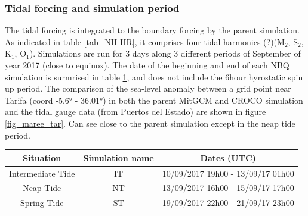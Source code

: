 \subsubsection{Tidal forcing and simulation period}
The tidal forcing is integrated to the boundary forcing by the parent simulation. As indicated in table \ref{tab_NH-HR},  it comprises four tidal harmonics (?)($\text{M}_{\text{2}}$, $\text{S}_{\text{2}}$, $\text{K}_{\text{1}}$, $\text{O}_{\text{1}}$). Simulations are run for 3 days along 3 different periods of September of year 2017 (close to equinox). The date of the beginning and end of each NBQ simulation is surmrised in table \ref{tab_dates_MIV}, and does not include the 6hour hyrostatic spin up period. The comparison of the sea-level anomaly between a grid point near Tarifa (coord -5.6° - 36.01°) in both the parent MitGCM and CROCO simulation and the tidal gauge data (from Puertos del Estado) are shown in figure \ref{fig_maree_tar}. Can see close to the parent simulation except in the neap tide period.

\begin{table}[h]
        \centering
        \begin{tabular}{|c|c|c|}
                \hline
                Situation & Simulation name & Dates (UTC)\\
                \hline
                Intermediate Tide & IT & 10/09/2017 19h00 - 13/09/17 01h00  \\
                Neap Tide& NT & 13/09/2017 16h00 - 15/09/17 17h00 \\
                Spring Tide& ST & 19/09/2017 22h00 - 21/09/17 23h00  \\
                \hline
        \end{tabular}
        \label{tab_dates_MIV}
\end{table}

